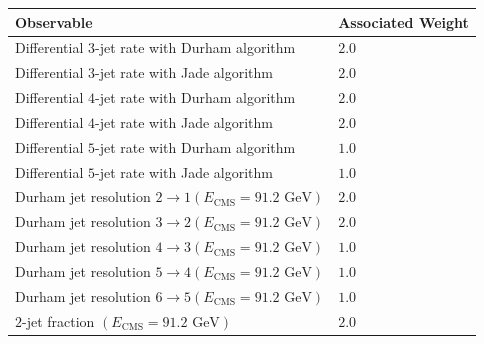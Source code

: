 \documentclass[aps,preprint,floatfix,nofootinbib,showpacs]{revtex4-1}
\begin{document}
   \begin{table}[tbp]
  \begin{center}
   \begin{tabular}{l|l}
    \hline 
    \hline
    Observable  \hspace{3cm}                                           &  \hspace{1cm} Associated Weight \\ \hline
    Differential $3$-jet rate with Durham algorithm                    &  \hspace{3cm} $2.0$ \\ \hline
    Differential $3$-jet rate with Jade algorithm                      &  \hspace{3cm} $2.0$ \\ \hline
    Differential $4$-jet rate with Durham algorithm                    &  \hspace{3cm} $2.0$ \\ \hline
    Differential $4$-jet rate with Jade algorithm                      &  \hspace{3cm} $2.0$ \\ \hline
    Differential $5$-jet rate with Durham algorithm                    &  \hspace{3cm} $1.0$ \\ \hline
    Differential $5$-jet rate with Jade algorithm                      &  \hspace{3cm} $1.0$ \\ \hline 
    Durham jet resolution $2\to1  (E_{\text{CMS}}=91.2 \text{ GeV})$    &  \hspace{3cm} $2.0$ \\ \hline
    Durham jet resolution $3\to2  (E_{\text{CMS}}=91.2 \text{ GeV})$    &  \hspace{3cm} $2.0$ \\ \hline
    Durham jet resolution $4\to3  (E_{\text{CMS}}=91.2 \text{ GeV})$    &  \hspace{3cm} $1.0$ \\ \hline
    Durham jet resolution $5\to4  (E_{\text{CMS}}=91.2 \text{ GeV})$    &  \hspace{3cm} $1.0$ \\ \hline
    Durham jet resolution $6\to5  (E_{\text{CMS}}=91.2 \text{ GeV})$    &  \hspace{3cm} $1.0$ \\ \hline
    $2$-jet fraction $(E_{\text{CMS}}=91.2 \text{ GeV})$               &  \hspace{3cm} $2.0$ \\ \hline

\end{tabular}
\end{center}
\end{table}
\end{document}
